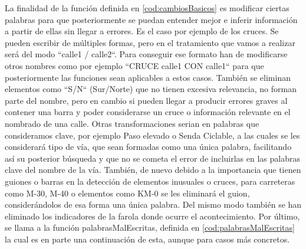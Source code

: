 




La finalidad de la función definida en \ref{cod:cambiosBasicos} es modificar ciertas palabras para que posteriormente se puedan entender mejor e inferir información a partir de ellas sin llegar a errores.
\newline
Es el caso por ejemplo de los cruces. Se pueden escribir de múltiples formas, pero en el tratamiento que vamos a realizar será del modo ``calle1 / calle2``. Para conseguir ese formato han de modificarse otros nombres como por ejemplo ``CRUCE calle1 CON calle1`` para que posteriormente las funciones sean aplicables a estos casos.
\newline
También se eliminan elementos como ``S/N`` (Sur/Norte) que no tienen excesiva relevancia, no forman parte del nombre, pero en cambio si pueden llegar a producir errores graves al contener una barra y poder considerarse un cruce o información relevante en el nombrado de una calle.
\newline
Otras transformaciones serian en palabras que consideramos clave, por ejemplo Paso elevado o Senda Ciclable, a las cuales se les considerará tipo de vía, que sean formadas como una única palabra, facilitando así su posterior búsqueda y que no se cometa el error de incluirlas en las palabras clave del nombre de la vía.
\newline
También, de nuevo debido a la importancia que tienen guiones o barras en la detección de elementos inusuales o cruces, para carreteras como M-30, M-40 o elementos como KM-0 se les eliminará el guion, considerándolos de esa forma una única palabra. Del mismo modo también se han eliminado los indicadores de la farola donde ocurre el acontecimiento.
\newline
Por último, se llama a la función palabrasMalEscritas, definida en \ref{cod:palabrasMalEscritas} la cual es en parte una continuación de esta, aunque para casos más concretos.

\clearpage


